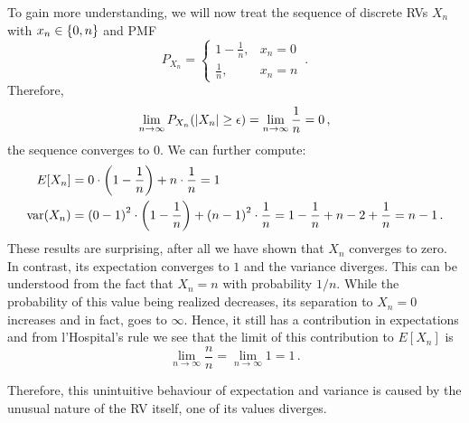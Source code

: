 \begin{ex}
To gain more understanding, we will now treat the sequence of discrete RVs $X_n$ with $x_n \in \qty{0, n}$ and PMF
\begin{equation*}
P_{X_n} = \begin{cases} 1 - \frac{1}{n}, & x_n = 0 \\ \frac{1}{n}, & x_n = n \end{cases} \, .
\end{equation*}
Therefore,
\begin{equation*}
\lim_{n \rightarrow \infty} P_{X_n}\qty(\abs{X_n} \geq \epsilon) = \lim_{n \rightarrow \infty} \frac{1}{n} = 0 \, ,
\end{equation*}
the sequence converges to $0$. We can further compute:
\begin{align*}
E[X_n] &= 0 \cdot \qty(1 - \frac{1}{n}) + n \cdot \frac{1}{n} = 1
\\
\operatorname{var}(X_n) &= \qty(0 - 1)^2 \cdot \qty(1 - \frac{1}{n}) + \qty(n - 1)^2 \cdot \frac{1}{n} = 1 - \frac{1}{n} + n - 2 + \frac{1}{n} = n - 1 \, .
\end{align*}
These results are surprising, after all we have shown that $X_n$ converges to zero. In contrast, its expectation converges to $1$ and the variance diverges. This can be understood from the fact that $X_n = n$ with probability $1 / n$. While the probability of this value being realized decreases, its separation to $X_n = 0$ increases and in fact, goes to $\infty$. Hence, it still has a contribution in expectations and from l'Hospital's rule we see that the limit of this contribution to $E[X_n]$ is
\begin{equation*}
\lim_{n \rightarrow \infty} \frac{n}{n} = \lim_{n \rightarrow \infty} 1 = 1 \, .
\end{equation*}

Therefore, this unintuitive behaviour of expectation and variance is caused by the unusual nature of the RV itself, one of its values diverges.

\end{ex}


